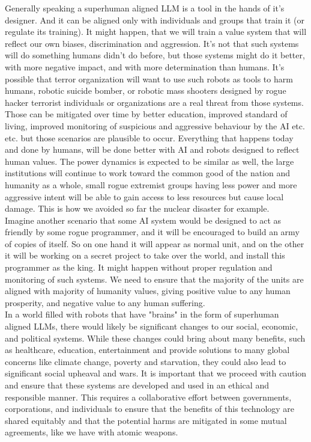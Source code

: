 \documentclass{article}
\begin{document}
Generally speaking a superhuman aligned LLM is a tool in the hands of it's designer. And it can be aligned only with individuals and groups that train it (or regulate its training). It might happen, that we will train a value system that will reflect our own biases, discrimination\cite{belenguer2022AIbias} and aggression. It's not that such systems will do something humans didn't do before, but those systems might do it better, with more negative impact, and with more determination than humans. It's possible that terror organization will want to use such robots as tools to harm humans, robotic suicide bomber, or robotic mass shooters designed by rogue hacker terrorist individuals or organizations are a real threat from those systems. Those can be mitigated over time by better education, improved standard of living, improved monitoring of suspicious and aggressive behaviour by the AI etc. etc. but those scenarios are plausible to occur. Everything that happens today and done by humans, will be done better with AI and robots designed to reflect human values. The power dynamics is expected to be similar as well, the large institutions will continue to work toward the common good of the nation and humanity as a whole, small rogue extremist groups having less power and more aggressive intent will be able to gain access to less resources but cause local damage. This is how we avoided so far the nuclear disaster for example. \\

Imagine another scenario that some AI system would be designed to act as friendly by some rogue programmer, and it will be encouraged to build an army of copies of itself. So on one hand it will appear as normal unit, and on the other it will be working on a secret project to take over the world, and install this programmer as the king. It might happen without proper regulation and monitoring of such systems. We need to ensure that the majority of the units are aligned with majority of humanity values, giving positive value to any human prosperity, and negative value to any human suffering.\\

In a world filled with robots that have "brains" in the form of superhuman aligned LLMs, there would likely be significant changes to our social, economic, and political systems. While these changes could bring about many benefits, such as healthcare, education, entertainment and provide solutions to many global concerns like climate change, poverty and starvation, they could also lead to significant social upheaval and wars. It is important that we proceed with caution and ensure that these systems are developed and used in an ethical and responsible manner. This requires a collaborative effort between governments, corporations, and individuals to ensure that the benefits of this technology are shared equitably and that the potential harms are mitigated in some mutual agreements, like we have with atomic weapons. \\
\end{document}
